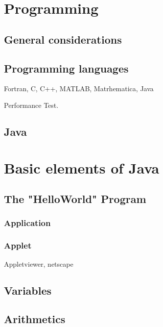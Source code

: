 
\section{Programming}
\label{sec:Programming}



\subsection{General considerations}
\label{sec:General_considerations}


\subsection{Programming languages}
\label{sec:Programming_languages}

Fortran, C, C++, MATLAB, Matrhematica, Java

Performance Test.


\subsection{Java}
\label{sec:Java}


\section{Basic elements of Java}
\label{sec:Basic_elements_of_Java}


\subsection{The "HelloWorld" Program}
\label{sec:HelloWorld}


\subsubsection{Application}


\subsubsection{Applet}

Appletviewer, netscape


\subsection{Variables}
\label{sec:Variables}


\subsection{Arithmetics}
\label{sec:Arithmetics}


